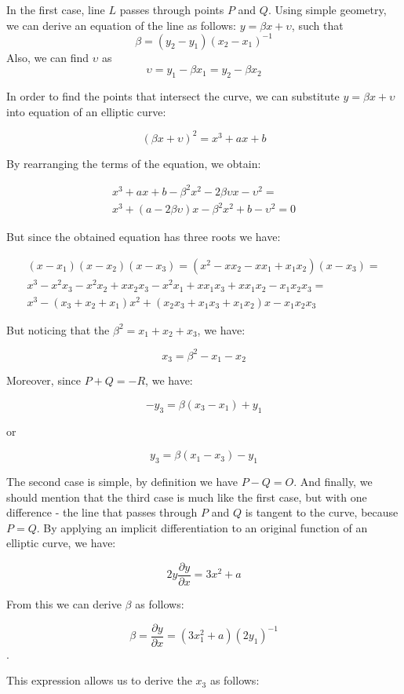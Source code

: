In the first case, line $L$ passes through points $P$ and $Q$. Using simple geometry, 
we can derive an equation of the line as follows: $y = \beta x + \upsilon$, such that
$$\beta = (y_2-y_1)(x_2-x_1)^{-1}$$ Also, we can find $\upsilon$ as 
$$\upsilon=y_1-\beta x_1=y_2-\beta x_2$$

In order to find the points that intersect the curve, we can substitute $y=\beta x+ \upsilon$
into equation of an elliptic curve:

$$(\beta x+ \upsilon)^2=x^3+ax+b$$

By rearranging the terms of the equation, we obtain:

\begin{multline*}
x^3+ax+b-\beta^2x^2-2\beta \upsilon x - \upsilon^2=\\
x^3+(a-2\beta \upsilon)x-\beta^2x^2+b-\upsilon^2=0
\end{multline*}

But since the obtained equation has three roots we have:

\begin{multline*}
(x-x_1)(x-x_2)(x-x_3)=(x^2-xx_2-xx_1+x_1x_2)(x-x_3)=\\
x^3-x^2x_3-x^2x_2+xx_2x_3-x^2x_1+xx_1x_3+xx_1x_2-x_1x_2x_3 = \\
x^3-(x_3+x_2+x_1)x^2+(x_2x_3+x_1x_3+x_1x_2)x-x_1x_2x_3
\end{multline*}

But noticing that the $\beta^2=x_1+x_2+x_3$, we have:

$$x_3=\beta^2-x_1-x_2$$

Moreover, since $P+Q=-R$, we have:

$$-y_3=\beta(x_3-x_1) + y_1$$

or

$$y_3=\beta(x_1-x_3) - y_1$$

The second case is simple, by definition we have $P-Q=O$.
And finally, we should mention that the third case is much like 
the first case, but with one difference - the line that passes through
$P$ and $Q$ is tangent to the curve, because $P=Q$. By applying an
implicit differentiation to an original function of an elliptic curve,
we have:

$$2y\frac{\partial y}{\partial x}=3x^2+a$$

From this we can derive $\beta$ as follows:

$$\beta = \frac{\partial y}{\partial x}=(3x_1^2+a)(2y_1)^{-1}$$.

This expression allows us to derive the $x_3$ as follows:


